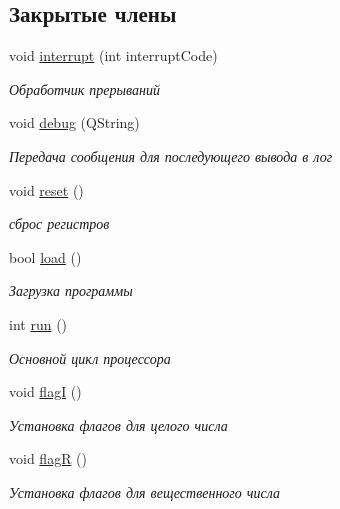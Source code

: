 \subsection*{Закрытые члены}
\begin{DoxyCompactItemize}
\item 
void \hyperlink{class_computer_aa57b0ed2f3a9b168c2924174ec524bd4}{interrupt} (int interrupt\+Code)
\begin{DoxyCompactList}\small\item\em Обработчик прерываний \end{DoxyCompactList}\item 
void \hyperlink{class_computer_a10ca6c6b200630119201de16d7368e0f}{debug} (Q\+String)
\begin{DoxyCompactList}\small\item\em Передача сообщения для последующего вывода в лог \end{DoxyCompactList}\item 
void \hyperlink{class_computer_aeab90cbacbef385685717c249a07929d}{reset} ()
\begin{DoxyCompactList}\small\item\em сброс регистров \end{DoxyCompactList}\item 
bool \hyperlink{class_computer_adeb4bbeee2b9c13616dc8c4ef52cbe60}{load} ()
\begin{DoxyCompactList}\small\item\em Загрузка программы \end{DoxyCompactList}\item 
int \hyperlink{class_computer_af337e329e3bc6d80bbd7070e25ce5731}{run} ()
\begin{DoxyCompactList}\small\item\em Основной цикл процессора \end{DoxyCompactList}\item 
void \hyperlink{class_computer_aae4a76a8a03a6c9fb1c12968d629be3e}{flagI} ()
\begin{DoxyCompactList}\small\item\em Установка флагов для целого числа \end{DoxyCompactList}\item 
void \hyperlink{class_computer_aae860bb217270ec88e8ebf6fe2c2adc9}{flagR} ()
\begin{DoxyCompactList}\small\item\em Установка флагов для вещественного числа \end{DoxyCompactList}\end{DoxyCompactItemize}
